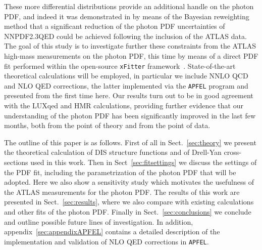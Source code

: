 These more differential distributions provide an additional handle
on the photon PDF, and indeed it was demonstrated in by means
of the Bayesian reweighting method that a significant reduction of
the photon PDF uncertainties of NNPDF2.3QED could be achieved
following the inclusion of the ATLAS data.
%
The goal of this study is to investigate further these constraints
from the ATLAS high-mass measurements on the photon PDF,
this time by means of a direct PDF fit performed within the
open-source {\tt xFitter} framework~\cite{Alekhin:2014irh}.
%
State-of-the-art theoretical calculations will be employed,
in particular
we include NNLO QCD and NLO QED corrections, the latter implemented
via the {\tt APFEL} program and presented from the first time
here.
%
Our results turn out to be in good agreement with the LUXqed and HMR
calculations, providing further evidence that our understanding
of the photon PDF has been significantly improved in the last
few months, both from the point of theory and from
the point of data.

The outline of this paper is as follows.
%
First of all in Sect.~\ref{sec:theory} we present the theoretical
calculation of DIS structure functions and of Drell-Yan cross-sections
used in this work.
%
Then in Sect~\ref{sec:fitsettings} we discuss the settings of
the PDF fit, including the parametrization of the photon PDF
that will be adopted.
%
Here we also show a sensitivity study which motivates the
usefulness of the ATLAS measurements for the photon PDF.
%
The results of this work are presented in Sect.~\ref{sec:results},
where we also compare with existing calculations and other
fits of the photon PDF.
%
Finally in Sect.~\ref{sec:conclusions} we conclude
and outline possible future lines of investigation.
%
In addition, appendix~\ref{sec:appendixAPFEL} contains a detailed description of
the implementation and validation of NLO QED corrections
in {\tt APFEL}.
